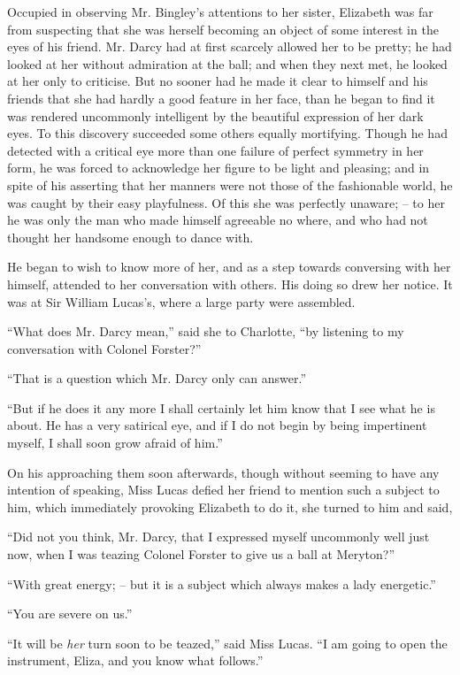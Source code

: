 Occupied in observing Mr. Bingley’s attentions to her
sister, Elizabeth was far from suspecting that she was
herself becoming an object of some interest in the eyes
of his friend. Mr. Darcy had at first scarcely allowed
her to be pretty; he had looked at her without admiration
at the ball; and when they next met, he looked at her
only to criticise. But no sooner had he made it clear to
himself and his friends that she had hardly a good feature
in her face, than he began to find it was rendered uncommonly
intelligent by the beautiful expression of her dark
eyes. To this discovery succeeded some others equally
mortifying. Though he had detected with a critical eye
more than one failure of perfect symmetry in her form,
he was forced to acknowledge her figure to be light and
pleasing; and in spite of his asserting that her manners
were not those of the fashionable world, he was caught
by their easy playfulness. Of this she was perfectly
unaware; -- to her he was only the man who made himself
agreeable no where, and who had not thought her handsome
enough to dance with.

He began to wish to know more of her, and as a step
towards conversing with her himself, attended to her
conversation with others. His doing so drew her notice.
It was at Sir William Lucas’s, where a large party were
assembled.

“What does Mr. Darcy mean,” said she to Charlotte,
“by listening to my conversation with Colonel Forster?”

“That is a question which Mr. Darcy only can answer.”

“But if he does it any more I shall certainly let him
know that I see what he is about. He has a very satirical
eye, and if I do not begin by being impertinent myself,
I shall soon grow afraid of him.”

On his approaching them soon afterwards, though
without seeming to have any intention of speaking, Miss
Lucas defied her friend to mention such a subject to him,
which immediately provoking Elizabeth to do it, she
turned to him and said,

“Did not you think, Mr. Darcy, that I expressed myself
uncommonly well just now, when I was teazing Colonel
Forster to give us a ball at Meryton?”

“With great energy; -- but it is a subject which always
makes a lady energetic.”

“You are severe on us.”

“It will be \textit{her} turn soon to be teazed,” said Miss
Lucas. “I am going to open the instrument, Eliza, and
you know what follows.”

